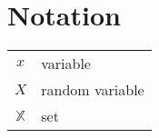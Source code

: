 \chapter*{Notation}

\begin{tabular}{cp{}}
    $x$ & variable \\
    $X$ & random variable \\
    $\mathbb{X}$ & set
\end{tabular}\\
